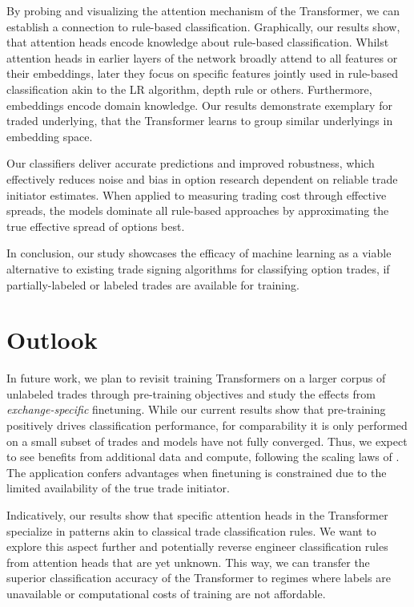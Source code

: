 By probing and visualizing the attention mechanism of the Transformer, we can establish a connection to rule-based classification. Graphically, our results show, that attention heads encode knowledge about rule-based classification. Whilst attention heads in earlier layers of the network broadly attend to all features or their embeddings, later they focus on specific features jointly used in rule-based classification akin to the \gls{LR} algorithm, depth rule or others. Furthermore, embeddings encode domain knowledge. Our results demonstrate exemplary for traded underlying, that the Transformer learns to group similar underlyings in embedding space.

Our classifiers deliver accurate predictions and improved robustness, which effectively reduces noise and bias in option research dependent on reliable trade initiator estimates. When applied to measuring trading cost through effective spreads, the models dominate all rule-based approaches by approximating the true effective spread of options best. %

In conclusion, our study showcases the efficacy of machine learning as a viable alternative to existing trade signing algorithms for classifying option trades, if partially-labeled or labeled trades are available for training. %

\newpage
\section{Outlook}\label{sec:outlook}

In future work, we plan to revisit training Transformers on a larger corpus of unlabeled trades through pre-training objectives and study the effects from \emph{exchange-specific} finetuning. While our current results show that pre-training positively drives classification performance, for comparability it is only performed on a small subset of trades and models have not fully converged. Thus, we expect to see benefits from additional data and compute, following the scaling laws of \textcite[][7]{hoffmannTrainingComputeOptimalLarge2022}. The application confers advantages when finetuning is constrained due to the limited availability of the true trade initiator.

Indicatively, our results show that specific attention heads in the Transformer specialize in patterns akin to classical trade classification rules. We want to explore this aspect further and potentially reverse engineer classification rules from attention heads that are yet unknown. This way, we can transfer the superior classification accuracy of the Transformer to regimes where labels are unavailable or computational costs of training are not affordable.